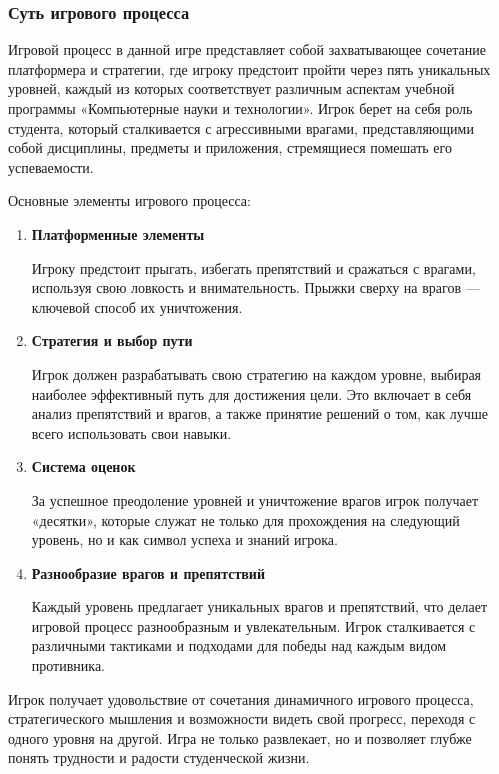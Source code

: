 \subsubsection{Суть игрового процесса}
    Игровой процесс в данной игре представляет собой захватывающее сочетание платформера и стратегии, где игроку предстоит пройти через пять уникальных уровней, каждый из которых соответствует различным аспектам учебной программы «Компьютерные науки и технологии». Игрок берет на себя роль студента, который сталкивается с агрессивными врагами, представляющими собой дисциплины, предметы и приложения, стремящиеся помешать его успеваемости.\par
    Основные элементы игрового процесса:\par
    \begin{enumerate}
    \item \textbf{Платформенные элементы} \par
    Игроку предстоит прыгать, избегать препятствий и сражаться с врагами, используя свою ловкость и внимательность. Прыжки сверху на врагов — ключевой способ их уничтожения.
    \item\textbf{Стратегия и выбор пути} \par
    Игрок должен разрабатывать свою стратегию на каждом уровне, выбирая наиболее эффективный путь для достижения цели. Это включает в себя анализ препятствий и врагов, а также принятие решений о том, как лучше всего использовать свои навыки.
    \item \textbf{Система оценок} \par
    За успешное преодоление уровней и уничтожение врагов игрок получает «десятки», которые служат не только для прохождения на следующий уровень, но и как символ успеха и знаний игрока.
    \item \textbf{Разнообразие врагов и препятствий} \par
    Каждый уровень предлагает уникальных врагов и препятствий, что делает игровой процесс разнообразным и увлекательным. Игрок сталкивается с различными тактиками и подходами для победы над каждым видом противника.
    \end{enumerate}
    Игрок получает удовольствие от сочетания динамичного игрового процесса, стратегического мышления и возможности видеть свой прогресс, переходя с одного уровня на другой. Игра не только развлекает, но и позволяет глубже понять трудности и радости студенческой жизни.


